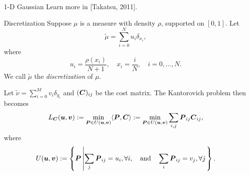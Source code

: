 \begin{frame}{1-D Gaussian}
    \vspace{-1em}
    Learn more in [Takatsu, 2011].
\end{frame}

\begin{frame}{Discretization}
    \footnotesize
    Suppose $\mu$ is a measure with density $\rho$, supported on $[0,1]$.
    Let
    \begin{equation}
        \tilde\mu = \sum_{i=0}^N u_i \delta_{x_i}, 
    \end{equation}
    where
    \begin{equation}
        u_i = \frac{\rho(x_i)}{N+1},\quad x_i=\frac{i}{N},\quad i=0,...,N.
    \end{equation}
    We call $\tilde\mu$ the \textit{discretization} of $\mu$.
    
    \pause\vspace{1em}
    Let $\tilde\nu = \sum_{i=0}^M v_i \delta_{y_i}$ 
    and $(\boldsymbol{C})_{ij}$ be the cost matrix.
    The Kantorovich problem then becomes
    \begin{equation}
        L_{\boldsymbol C}(\boldsymbol u,\boldsymbol v) := \min_{\boldsymbol P\in U(\boldsymbol u, \boldsymbol v)} \langle \boldsymbol P, \boldsymbol C \rangle
        := \min_{\boldsymbol P\in U(\boldsymbol u, \boldsymbol v)} \sum_{i,j} \boldsymbol{P}_{ij} \boldsymbol{C}_{ij},
    \end{equation}
    where
    \begin{equation}
        U(\boldsymbol u,\boldsymbol v) := \left\{ \boldsymbol P \left| 
        \sum_{j} \boldsymbol{P}_{ij} = u_i,\forall i,\quad \text{and}\quad
        \sum_{i} \boldsymbol{P}_{ij} = v_j,\forall j
        \right.
        \right\}.
    \end{equation}
\end{frame}

